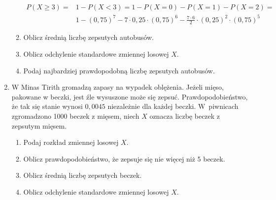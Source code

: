 \documentclass[twoside]{mwart}
\newcommand{\ans}[1]{}
\newenvironment{ansenv}{\comment}{\endcomment}
\newenvironment{ansenv}{\paragraph{Odpowiedź:}}{}
\newcommand{\ans}[1]{\begin{ansenv}#1\end{ansenv}}
\begin{document}
\begin{enumerate}
\begin{enumerate}
{\begin{align*}
	 P(X\geq 3) = & 1-P(X<3)=1-P(X=0)-P(X=1)-P(X=2) = \\ & 1 - (0{,}75)^7 - 7\cdot 0{,}25 \cdot (0{,}75)^6 - \frac{7\cdot 6}{2} \cdot (0{,}25)^2\cdot (0{,}75)^5 
	\end{align*}
}
\item Oblicz średnią liczbę zepsutych autobusów.
\ans{
	\[ EX=np=7\cdot 0{,}25 = 1{,}75 \]
}
\item Oblicz odchylenie standardowe zmiennej losowej $X$.
\ans{
	\[ DX=\sqrt{np(1-p)}=\sqrt{7\cdot 0{,}25\cdot 0{,}75}=\frac{\sqrt{21}}{4} \approx 1{,}15 \]
}
\item Podaj najbardziej prawdopodobną liczbę zepsutych autobusów. \ans{
	Iloczyn $(n+1)p=2$ jest liczbą całkowitą, zatem mamy dwa punkty skokowe, które są najbardziej prawdopodobne:
	\[(n+1)p-1=1, (n+1)p=2\]}
\end{enumerate}
\item W Minas Tirith gromadzą zapasy na wypadek oblężenia. Jeżeli mięso,
pakowane w beczki, jest źle wysuszone może się zepsuć. Prawdopodobieństwo, że
tak się stanie wynosi $0{,}0045$ niezależnie dla każdej beczki. W~piwnicach zgromadzono 1000 beczek z mięsem,
niech $X$ oznacza liczbę beczek z zepsutym mięsem.  \begin{enumerate}
\item Podaj rozkład zmiennej losowej $X$. \ans{
	Mamy podobną sytuację jak w poprzednich zadaniach, możemy więc posłużyć się rozkładem dwumianowym:
	\[P(X=k)={1000\choose k}p^k(1-p)^{1000-k}\]
	Ponieważ mamy do czynienia z dużą liczbą mało prawdopodobnych prób ($n>50, p<0{,}1, np<10$) możemy posłużyć się też przybliżeniem rozkładem Poissona:
	\[ P(X=k) = \frac{\lambda^k}{k!}e^{-\lambda} \quad \lambda=1000\cdot0{,}0045=4{,}5\]}
\item Oblicz prawdopodobieństwo, że zepsuje się nie więcej niż 5 beczek. \ans{
	Możemy skorzystać ze stablicowanego rozkładu Poissona (dostępny na końcu tego rozdziału), odczytujemy wartości z wiersza odpowiadającego $\lambda=4{,}5$ i kolumn odpowiadających punktom skokowym, które nas interesują:
	\begin{align*}
		P(X\leq 5)= & P(X=0)+P(X=1)+P(X=2)+P(X=3)+P(X=4)+P(X=5) = \\ &
		0{,}0111	+ 0{,}0500	+ 0{,}1125	+ 0{,}1687	+ 0{,}1898	+ 0{,}1708 =
	0{,}70290
	\end{align*}
}
\item Oblicz średnią liczbę zepsutych beczek. \ans{$EX=\lambda=4{,}5$}
\item Oblicz odchylenie standardowe zmiennej losowej $X$. \ans{$DX=\sqrt{\lambda} = \sqrt{4{,}5}$}

\end{enumerate}
\end{enumerate}
\end{document}

